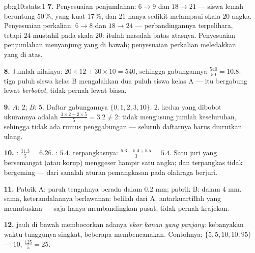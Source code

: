 \begin{solution}{pb:g10:stats:1}
\textbf{7.} Penyesuaian penjumlahan: $6 \to 9$ dan $18 \to 21$ --- siswa
lemah beruntung $50\,\%$, yang kuat $17\,\%$, dan $21$
hanya sedikit melampaui skala $20$ angka. Penyesuaian perkalian:
$6 \to 8$ dan $18 \to 24$ --- perbandingannya terpelihara, tetapi $24$
mustahil pada skala $20$: itulah masalah batas atasnya. Penyesuaian
penjumlahan menyanjung yang di bawah; penyesuaian perkalian meledakkan
yang di atas.

\textbf{8.} Jumlah nilainya: $20 \times 12 + 30 \times 10 = 540$,
sehingga  gabungannya $\frac{540}{50} = 10.8$: tiga puluh siswa
kelas B mengalahkan dua puluh siswa kelas A ---  itu bergabung
lewat  \emph{berbobot}, tidak pernah lewat  biasa.

\textbf{9.}  $A$: $2$;  $B$: $5$. Daftar gabungannya
$\{0, 1, 2, 3, 10\}$:  $2$.  kedua  yang
dibobot ukurannya adalah $\frac{3 \times 2 + 2 \times 5}{5} = 3.2
\neq 2$:  tidak mengusung jumlah keseluruhan, sehingga tidak ada rumus
penggabungan --- seluruh daftarnya harus diurutkan ulang.

\textbf{10.} : $\frac{31.3}{5} = 6.26$. : $5.4$.
 terpangkasnya: $\frac{5.3 + 5.4 + 5.5}{3} = 5.4$. Satu
juri yang bersemangat (atau korup) menggeser  hampir satu
angka;  dan  terpangkas tidak bergeming --- dari sanalah
aturan pemangkasan pada olahraga berjuri.

\textbf{11.} Pabrik A: paruh tengahnya berada dalam $0.2$ mm; pabrik B:
dalam $4$ mm.  sama, keterandalannya berlawanan: belilah dari A.
 antarkuartillah yang memutuskan ---  saja hanya
membandingkan pusat, tidak pernah keajekan.

\textbf{12.}  jauh di bawah  membocorkan adanya \emph{ekor
kanan yang panjang}: kebanyakan waktu tunggunya singkat, beberapa
membencanakan. Contohnya:
$\{5, 5, 10, 10, 95\}$ ---  $10$, 
$\frac{125}{5} = 25$.


\end{solution}
